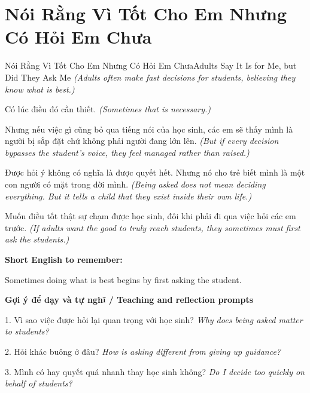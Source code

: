 \section{Nói Rằng Vì Tốt Cho Em Nhưng Có Hỏi Em Chưa}
\begin{truyen}{Nói Rằng Vì Tốt Cho Em Nhưng Có Hỏi Em Chưa}{Adults Say It Is for Me, but Did They Ask Me}
\textit{(Adults often make fast decisions for students, believing they know what is best.)}

Có lúc điều đó cần thiết.
\textit{(Sometimes that is necessary.)}

Nhưng nếu việc gì cũng bỏ qua tiếng nói của học sinh, các em sẽ thấy mình là người bị sắp đặt chứ không phải người đang lớn lên.
\textit{(But if every decision bypasses the student's voice, they feel managed rather than raised.)}

Được hỏi ý không có nghĩa là được quyết hết. Nhưng nó cho trẻ biết mình là một con người có mặt trong đời mình.
\textit{(Being asked does not mean deciding everything. But it tells a child that they exist inside their own life.)}

\end{truyen}

\begin{baihoc}
Muốn điều tốt thật sự chạm được học sinh, đôi khi phải đi qua việc hỏi các em trước.
\textit{(If adults want the good to truly reach students, they sometimes must first ask the students.)}
\end{baihoc}

\begin{ghinhoanh}
\textbf{Short English to remember:}

Sometimes doing what is best begins by first asking the student.

\end{ghinhoanh}

\begin{tuhocnhanh}
\textbf{Gợi ý để dạy và tự nghĩ / Teaching and reflection prompts}

1. Vì sao việc được hỏi lại quan trọng với học sinh? \textit{Why does being asked matter to students?}

2. Hỏi khác buông ở đâu? \textit{How is asking different from giving up guidance?}

3. Mình có hay quyết quá nhanh thay học sinh không? \textit{Do I decide too quickly on behalf of students?}
\end{tuhocnhanh}
\ngancach

